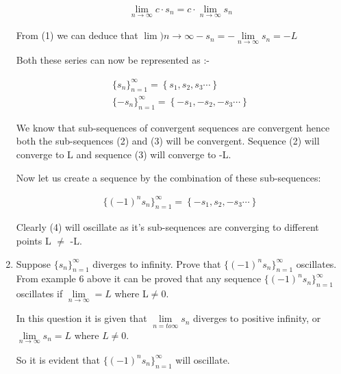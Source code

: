 \documentclass[11pt, letterpaper]{article}
\begin{document}
\begin{enumerate}
{	\setcounter{equation}{0}
	
	\begin{eqnarray}
		\lim \limits_{n \to \infty} c\cdot s_n = c \cdot \lim \limits_{n \to \infty} s_n
	\end{eqnarray}
	
	From (1) we can deduce that $\lim \limits){n \to \infty} -s_n = -\lim \limits_{n \to \infty} s_n = -L$
	
	Both these series can now be represented as :-
	
	\begin{eqnarray}
		\lbrace s_n \rbrace_{n=1}^\infty = \left\lbrace s_1, s_2, s_3 \cdots \right\rbrace \\
		\lbrace -s_n \rbrace_{n=1}^\infty = \left\lbrace -s_1, -s_2, -s_3 \cdots \right\rbrace
	\end{eqnarray}
	
	We know that sub-sequences of convergent sequences are convergent hence both the sub-sequences (2) and (3) will be convergent. Sequence (2) will converge to L and sequence (3) will converge to -L.
	
	Now let us create a sequence by the combination of these sub-sequences:
	
	\begin{eqnarray}
		 \lbrace (-1)^ns_n \rbrace_{n=1}^\infty = \left\lbrace -s_1, s_2, -s_3 \cdots \right\rbrace 
	\end{eqnarray}
	
	Clearly (4) will oscillate as it's sub-sequences are converging to different points L $\neq$ -L.
}

\item{Suppose $\lbrace s_n \rbrace_{n=1}^\infty$ diverges to infinity. Prove that $\lbrace (-1)^ns_n \rbrace_{n=1}^\infty$ oscillates.\\
	From example 6 above it can be proved that any sequence $ \lbrace (-1)^ns_n \rbrace_{n=1}^\infty $ oscillates if $\lim \limits_{n \to \infty} = L$ where L$\neq 0$.
	
	In this question it is given that $\lim \limits_{n =to \infty} s_n $ diverges to positive infinity, or $\lim \limits_{n \to \infty} s_n = L $ where $L \neq 0$.
	
	So it is evident that $ \lbrace (-1)^ns_n \rbrace_{n=1}^\infty $ will oscillate. 
}
\end{enumerate}
\clearpage
\end{document}

